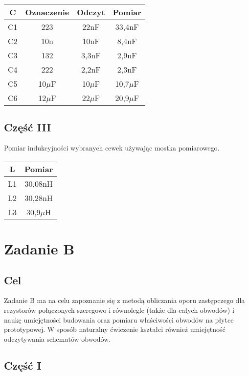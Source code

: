 \documentclass[polish,a4paper]{article}
\begin{document}
\begin{center}
\begin{tabular}{|c|c|c|c|}
\hline
\textbf{C} & \textbf{Oznaczenie} & \textbf{Odczyt} & \textbf{Pomiar}\\
\hline
C1 & 223 & 22nF & 33,4nF\\
\hline
C2 & 10n & 10nF & 8,4nF\\
\hline
C3 & 132 & 3,3nF & 2,9nF\\
\hline
C4 & 222 & 2,2nF & 2,3nF\\
\hline
C5 & 10$\mu$F & 10$\mu$F & 10,7$\mu$F\\
\hline
C6 & 12$\mu$F & 22$\mu$F & 20,9$\mu$F\\
\hline
\end{tabular}
\end{center}

\subsection{Część III}
Pomiar indukcyjności wybranych cewek używając mostka pomiarowego.\\

\begin{center}
\begin{tabular}{|c|c|}
\hline
\textbf{L} & \textbf{Pomiar}\\
\hline
L1 & 30,08nH\\
\hline
L2 & 30,28nH\\
\hline
L3 & 30,9$\mu$H\\
\hline
\end{tabular}
\end{center}

\section{Zadanie B}

\subsection*{Cel}

Zadanie B ma na celu zapoznanie się z metodą obliczania oporu zastępczego dla rezystorów połączonych szeregowo i równolegle (także dla całych obwodów) i naukę umiejętności budowania oraz pomiaru właściwości obwodów na płytce prototypowej. W sposób naturalny ćwiczenie kształci również umiejętność odczytywania schematów obwodów.\\

\subsection{Część I}
\end{document}
